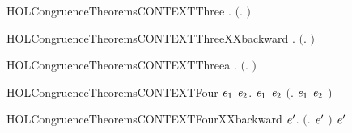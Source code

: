 \newcommand{\HOLCongruenceTheoremsCONTEXTTwo}{\UseVerbatim{HOLCongruenceTheoremsCONTEXTTwo}}
\begin{SaveVerbatim}{HOLCongruenceTheoremsCONTEXTThree}
\HOLTokenTurnstile{} \HOLSymConst{\HOLTokenForall{}} .   \HOLSymConst{\HOLTokenImp{}}  \ensuremath{(}\HOLTokenLambda{}. \HOLSymConst{\ensuremath{\ldotp}} \ensuremath{)}
\end{SaveVerbatim}
\newcommand{\HOLCongruenceTheoremsCONTEXTThree}{\UseVerbatim{HOLCongruenceTheoremsCONTEXTThree}}
\begin{SaveVerbatim}{HOLCongruenceTheoremsCONTEXTThreeXXbackward}
\HOLTokenTurnstile{} \HOLSymConst{\HOLTokenForall{}} .  \ensuremath{(}\HOLTokenLambda{}. \HOLSymConst{\ensuremath{\ldotp}} \ensuremath{)} \HOLSymConst{\HOLTokenImp{}}  
\end{SaveVerbatim}
\newcommand{\HOLCongruenceTheoremsCONTEXTThreeXXbackward}{\UseVerbatim{HOLCongruenceTheoremsCONTEXTThreeXXbackward}}
\begin{SaveVerbatim}{HOLCongruenceTheoremsCONTEXTThreea}
\HOLTokenTurnstile{} \HOLSymConst{\HOLTokenForall{}}.  \ensuremath{(}\HOLTokenLambda{}. \HOLSymConst{\ensuremath{\ldotp}}\ensuremath{)}
\end{SaveVerbatim}
\newcommand{\HOLCongruenceTheoremsCONTEXTThreea}{\UseVerbatim{HOLCongruenceTheoremsCONTEXTThreea}}
\begin{SaveVerbatim}{HOLCongruenceTheoremsCONTEXTFour}
\HOLTokenTurnstile{} \HOLSymConst{\HOLTokenForall{}}\ensuremath{\HOLBoundVar{e}\sb{\mathrm{1}}} \ensuremath{\HOLBoundVar{e}\sb{\mathrm{2}}}.  \ensuremath{\HOLBoundVar{e}\sb{\mathrm{1}}} \HOLSymConst{\HOLTokenConj{}}  \ensuremath{\HOLBoundVar{e}\sb{\mathrm{2}}} \HOLSymConst{\HOLTokenImp{}}  \ensuremath{(}\HOLTokenLambda{}. \ensuremath{\HOLBoundVar{e}\sb{\mathrm{1}}}  \HOLSymConst{\ensuremath{+}} \ensuremath{\HOLBoundVar{e}\sb{\mathrm{2}}} \ensuremath{)}
\end{SaveVerbatim}
\newcommand{\HOLCongruenceTheoremsCONTEXTFour}{\UseVerbatim{HOLCongruenceTheoremsCONTEXTFour}}
\begin{SaveVerbatim}{HOLCongruenceTheoremsCONTEXTFourXXbackward}
\HOLTokenTurnstile{} \HOLSymConst{\HOLTokenForall{}} \ensuremath{\HOLBoundVar{e}\sp{\prime}}.  \ensuremath{(}\HOLTokenLambda{}.   \HOLSymConst{\ensuremath{+}} \ensuremath{\HOLBoundVar{e}\sp{\prime}} \ensuremath{)} \HOLSymConst{\HOLTokenImp{}}   \HOLSymConst{\HOLTokenConj{}}  \ensuremath{\HOLBoundVar{e}\sp{\prime}}
\end{SaveVerbatim}
